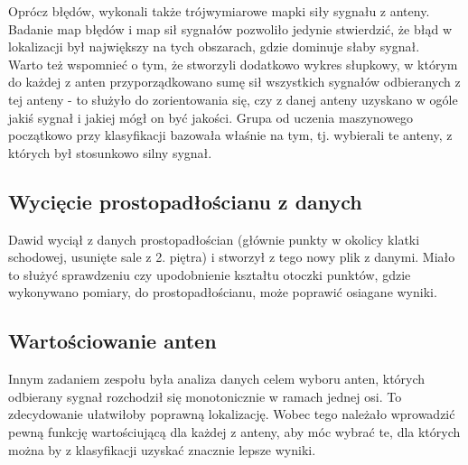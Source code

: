 \documentclass{article}
\begin{document}
Oprócz błędów, wykonali także trójwymiarowe mapki siły sygnału z anteny.
Badanie map błędów i map sił sygnałów pozwoliło jedynie stwierdzić, że błąd w lokalizacji był największy na tych obszarach, gdzie dominuje słaby sygnał.\\

Warto też wspomnieć o tym, że stworzyli dodatkowo wykres słupkowy, w którym do każdej z anten przyporządkowano sumę sił wszystkich sygnałów odbieranych z tej anteny - to służyło do zorientowania się, czy z danej anteny uzyskano w ogóle jakiś sygnał i jakiej mógł on być jakości. Grupa od uczenia maszynowego początkowo przy klasyfikacji bazowała właśnie na tym, tj. wybierali te anteny, z których był stosunkowo silny sygnał.\\

\subsection{Wycięcie prostopadłościanu z danych}

Dawid wyciął z danych prostopadłościan (głównie punkty w okolicy klatki schodowej, usunięte sale z 2. piętra) i stworzył z tego nowy plik z danymi. Miało to służyć sprawdzeniu czy upodobnienie kształtu otoczki punktów, gdzie wykonywano pomiary, do prostopadłościanu, może poprawić osiagane wyniki.\\

\subsection{Wartościowanie anten}

Innym zadaniem zespołu była analiza danych celem wyboru anten, których odbierany sygnał rozchodził się monotonicznie w ramach jednej osi. To zdecydowanie ułatwiłoby poprawną lokalizację. Wobec tego należało wprowadzić pewną funkcję wartościującą dla każdej z anteny, aby móc wybrać te, dla których można by z klasyfikacji uzyskać znacznie lepsze wyniki.\\
\end{document}
